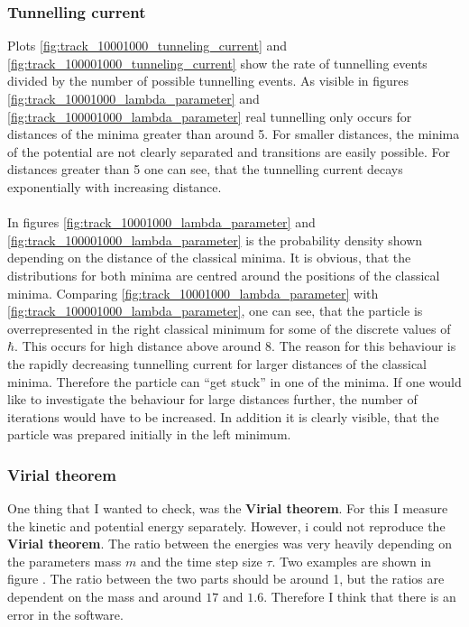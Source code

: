 \documentclass{scrartcl}
\begin{document}
	\subsubsection{Tunnelling current}
		Plots \ref{fig:track_10001000_tunneling_current} and \ref{fig:track_100001000_tunneling_current} show the rate of tunnelling events divided by the number of possible tunnelling events. %
		As visible in figures \ref{fig:track_10001000_lambda_parameter} and \ref{fig:track_100001000_lambda_parameter} real tunnelling only occurs for distances of the minima greater than around 5.
		For smaller distances, the minima of the potential are not clearly separated and transitions are easily possible. %
		For distances greater than 5 one can see, that the tunnelling current decays exponentially with increasing distance.
		\\
		\\
		In figures \ref{fig:track_10001000_lambda_parameter} and \ref{fig:track_100001000_lambda_parameter} is the probability density shown depending on the distance of the classical minima.
		It is obvious, that the distributions for both minima are centred around the positions of the classical minima.
		Comparing \ref{fig:track_10001000_lambda_parameter} with \ref{fig:track_100001000_lambda_parameter}, one can see, that the particle is overrepresented in the right classical minimum for some of the discrete values of $\hbar$.
		This occurs for high distance above around 8.
		The reason for this behaviour is the rapidly decreasing tunnelling current for larger distances of the classical minima.
		Therefore the particle can \enquote{get stuck} in one of the minima.
		If one would like to investigate the behaviour for large distances further, the number of iterations would have to be increased.
		In addition it is clearly visible, that the particle was prepared initially in the left minimum.

	\subsubsection{Virial theorem}
		One thing that I wanted to check, was the \textbf{Virial theorem}.
		For this I measure the kinetic and potential energy separately.
		However, i could not reproduce the \textbf{Virial theorem}.
		The ratio between the energies was very heavily depending on the parameters mass $m$ and the time step size $\tau$.
		Two examples are shown in figure \label{fig:track_1000100_virial}.
		The ratio between the two parts should be around 1, but the ratios are dependent on the mass and around $17$ and $1.6$.
		Therefore I think that there is an error in the software.
\end{document}
